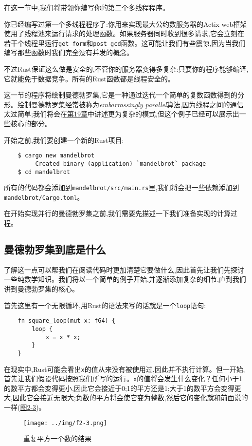 在这一节中,我们将带领你编写你的第二个多线程程序。

你已经编写过第一个多线程程序了:你用来实现最大公约数服务器的Actix web框架使用了线程池来运行请求的处理函数。如果服务器同时收到很多请求,它会立刻在若干个线程里运行\texttt{get\_form}和\texttt{post\_gcd}函数。这可能让我们有些震惊,因为当我们编写那些函数时我们完全没有并发的概念。

不过Rust保证这么做是安全的,不管你的服务器变得多复杂:只要你的程序能够编译,它就能免于数据竞争。所有的Rust函数都是线程安全的。

这一节的程序将绘制曼德勃罗集,它是一种通过迭代一个简单的复数函数得到的分形。绘制曼德勃罗集经常被称为\emph{embarrassingly parallel}算法,因为线程之间的通信太过简单;我们将会在\hyperref[ch19]{第19章}中讲述更为复杂的模式,但这个例子已经可以展示出一些核心的部分。

开始之前,我们要创建一个新的Rust项目:
\begin{verbatim}
    $ cargo new mandelbrot
         Created binary (application) `mandelbrot` package
    $ cd mandelbrot
\end{verbatim}

所有的代码都会添加到\texttt{mandelbrot/src/main.rs}里,我们将会把一些依赖添加到\\
\texttt{mandelbrot/Cargo.toml}。

在开始实现并行的曼德勃罗集之前,我们需要先描述一下我们准备实现的计算过程。

\subsection{曼德勃罗集到底是什么}\label{WhatIsMand}
了解这一点可以帮我们在阅读代码时更加清楚它要做什么,因此首先让我们先探讨一些纯数学知识。我们将以一个简单的例子开始,并逐渐添加复杂的细节,直到我们讲到曼德勃罗集的核心。

首先这里有一个无限循环,用Rust的语法来写的话就是一个\texttt{loop}语句:
\begin{verbatim}
    fn square_loop(mut x: f64) {
        loop {
            x = x * x;
        }
    }
\end{verbatim}

在现实中,Rust可能会看出\texttt{x}的值从来没有被使用过,因此并不执行计算。但一开始,首先让我们假设代码按照我们所写的运行。\texttt{x}的值将会发生什么变化？任何小于1的数平方都会变得更小,因此它会接近于0;1的平方还是1;大于1的数平方会变得更大,因此它会接近无限大;负数的平方将会使它变为整数,然后它的变化就和前面说的一样(\hyperref[f2-3]{图2-3})。
\begin{figure}[htbp]
    \centering
    \texttt{[image: ../img/f2-3.png]}
    \caption{重复平方一个数的结果}
    \label{f2-3}
\end{figure}


